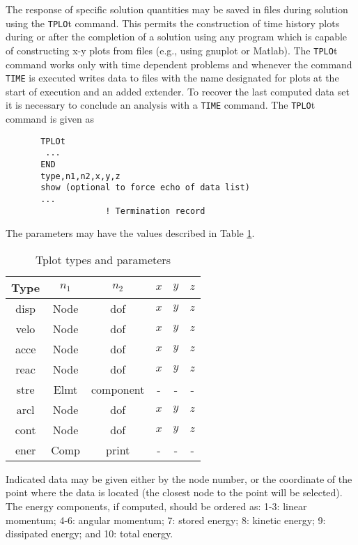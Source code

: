 The response of specific solution quantities may be saved in files during
solution using the {\tt TPLO}t command.  This permits the construction of
time history plots during or after the completion of a solution using any
program which is capable of constructing x-y plots from files (e.g., using
gnuplot or Matlab).  The {\tt TPLO}t command works only with time dependent
problems and whenever the command {\tt TIME} is executed writes
data to files with the
name designated for plots at the start of execution and an added extender. 
To recover the last computed data set it is necessary to conclude an analysis
with a {\tt TIME} command.  The {\tt TPLO}t command is given as
\begin{verbatim}
       TPLOt
        ...
       END
       type,n1,n2,x,y,z
       show (optional to force echo of data list)
       ...
                    ! Termination record
\end{verbatim}
The parameters may have the values described in Table \ref{tabtpl}.

\begin{table}
\begin{center}
\begin{tabular}{| c | c | c | c | c | c |} \hline
Type & $n_1$ & $n_2$ & $x$ & $y$ & $z$ \\ \hline
disp &  Node & dof   & $x$ & $y$ & $z$ \\
velo &  Node & dof   & $x$ & $y$ & $z$ \\
acce &  Node & dof   & $x$ & $y$ & $z$ \\
reac &  Node & dof   & $x$ & $y$ & $z$ \\
stre &  Elmt & component   & - & - & - \\
arcl &  Node & dof   & $x$ & $y$ & $z$ \\
cont &  Node & dof   & $x$ & $y$ & $z$ \\
ener &  Comp & print       & - & - & - \\ \hline 
\end{tabular}
\caption{Tplot types and parameters}
\label{tabtpl}
\end{center}
\end{table}

Indicated data may be given either by the node number, or the coordinate
of the point where the data is located (the closest node to the point
will be selected).  The energy components, if computed, should be ordered
as: 1-3: linear momentum; 4-6: angular momentum; 7: stored energy; 8: kinetic
energy; 9: dissipated energy; and 10: total energy.

